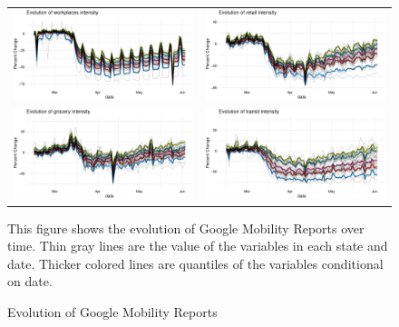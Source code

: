 \documentclass[3p, longtitle]{elsarticle}
\theoremstyle{definition}
\begin{document}
\begin{figure}[ht]\caption{Evolution of Google Mobility Reports \label{fig:gmr}}
  \begin{minipage}{\linewidth}
    \begin{tabular}{cc}
      \includegraphics[width=0.5\linewidth]{tables_and_figures/workplaces}
      &
      \includegraphics[width=0.5\linewidth]{tables_and_figures/retail}
      \\
      \includegraphics[width=0.5\linewidth]{tables_and_figures/grocery}
      &
      \includegraphics[width=0.5\linewidth]{tables_and_figures/transit}
    \end{tabular}
  \end{minipage}
     \begin{flushleft}
      \footnotesize This figure shows the evolution of Google Mobility
      Reports over time. Thin gray lines are the value of the
      variables in each state and date. Thicker colored lines are
      quantiles of the variables conditional on date.     \end{flushleft}
\end{figure}
\end{document}
